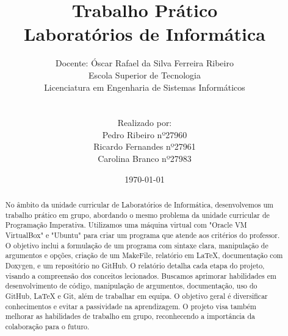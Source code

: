 \documentclass[a4wide]{report}
\title{Trabalho Prático \\ 
Laboratórios de Informática }
\author{Docente: Óscar Rafael da Silva Ferreira Ribeiro \\
Escola Superior de Tecnologia \\
Licenciatura em Engenharia de Sistemas Informáticos \\
\\
\\
Realizado por: \\
Pedro Ribeiro nº27960 \\
Ricardo Fernandes nº27961 \\
Carolina Branco nº27983\\}
\date{ \today } %
\begin{document}
\maketitle

\begin{abstract} %
\Large
No âmbito da unidade curricular de Laboratórios de Informática, desenvolvemos um trabalho prático em grupo, abordando o mesmo problema da unidade curricular de Programação Imperativa. Utilizamos uma máquina virtual com "Oracle VM VirtualBox" e "Ubuntu" para criar um programa que atende aos critérios do professor. O objetivo inclui a formulação de um programa com sintaxe clara, manipulação de argumentos e opções, criação de um MakeFile, relatório em LaTeX, documentação com Doxygen, e um repositório no GitHub. O relatório detalha cada etapa do projeto, visando a compreensão dos conceitos lecionados. Buscamos aprimorar habilidades em desenvolvimento de código, manipulação de argumentos, documentação, uso do GitHub, LaTeX e Git, além de trabalhar em equipa. O objetivo geral é diversificar conhecimentos e evitar a passividade na aprendizagem. O projeto visa também melhorar as habilidades de trabalho em grupo, reconhecendo a importância da colaboração para o futuro.

\end{abstract}

\tableofcontents
\listoffigures
\listoftables
\lstlistoflistings
\end{document}
